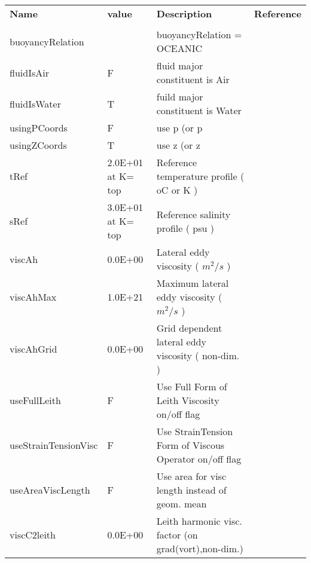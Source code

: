 \newpage

\begin{table}
\begin{tabular}{lllc}

  \textbf{Name}  &  \textbf{value}  
    &  \textbf{Description}   &  \textbf{Reference}  \\
  & & & \\

   buoyancyRelation   &   
    &   buoyancyRelation = OCEANIC
    &  %
    \\
   fluidIsAir    &                     F
    &   fluid major constituent is Air 
    &  %
    \\
   fluidIsWater  &                     T
    &   fuild major constituent is Water 
    &  %
    \\
   usingPCoords   &                     F
    &   use p (or p
    &  %
    \\
   usingZCoords   &                     T
    &   use z (or z
    &  %
    \\
   tRef   &      2.0E+01 at K= top
    &   Reference temperature profile ( oC or K ) 
    &  %
    \\
   sRef   &      3.0E+01  at K= top
    &   Reference salinity profile ( psu ) 
    &  %
    \\
   viscAh   &                   0.0E+00
    &   Lateral eddy viscosity ( $m^2/s$ ) 
    &  %
    \\
   viscAhMax   &                   1.0E+21
    &   Maximum lateral eddy viscosity ( $m^2/s$ ) 
    &  %
    \\
   viscAhGrid   &                   0.0E+00
    &   Grid dependent lateral eddy viscosity ( non-dim. ) 
    &  %
    \\
   useFullLeith   &                     F
    &   Use Full Form of Leith Viscosity on/off flag
    &  %
    \\
   useStrainTensionVisc   &                     F
    &   Use StrainTension Form of Viscous Operator on/off flag
    &  %
    \\
   useAreaViscLength   &                     F
    &   Use area for visc length instead of geom. mean
    &  %
    \\
   viscC2leith   &                   0.0E+00
    &   Leith harmonic visc. factor (on grad(vort),non-dim.) 
    &  %
    \\

\end{tabular}
\end{table}
